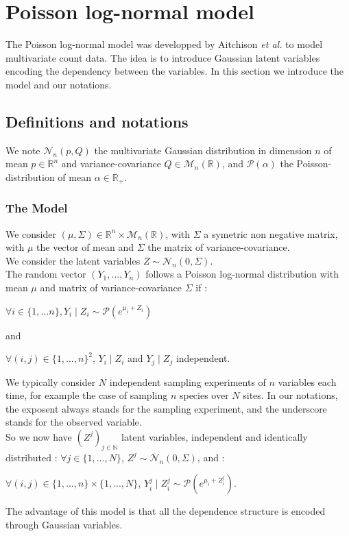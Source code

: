 \documentclass[11pt, a4paper]{article}
\begin{document}
\section{Poisson log-normal model}
The Poisson log-normal model was developped by Aitchison \textit{et al.}\cite{aitchison1989multivariate} to model multivariate count data.  The idea is to introduce Gaussian latent variables encoding the dependency between the variables. In this section we introduce the model and our notations.
\subsection{Definitions and notations}
We note $\mathcal{N}_n (p,Q)$ the multivariate Gaussian distribution in dimension $n$ of mean $p \in \mathbb{R}^n$ and variance-covariance $Q \in \mathcal{M}_n(\mathbb{R})$, and $\mathcal{P}(\alpha)$ the Poisson-distribution of mean $\alpha \in \mathbb{R}_+$.
\subsubsection{The Model} 
We consider $(\mu,\Sigma) \in \mathbb{R}^n \times \mathcal{M}_n(\mathbb{R})$, with $\Sigma$ a symetric non negative matrix, with $\mu$ the vector of mean and $\Sigma$ the matrix of variance-covariance.\\
We consider the latent variables $Z \sim \mathcal{N}_n(0,\Sigma)$.\\
The random vector $(Y_1,...,Y_n)$ follows a Poisson log-normal distribution with mean $\mu$ and matrix of variance-covariance $\Sigma$ if :
\begin{center}
$\forall i \in \{1,...n\}, Y_i \mid Z_i \sim \mathcal{P}(e^{\mu_i+Z_i})$
\end{center}
and 
\begin{center}
$\forall (i,j) \in \{1,...,n\}^2$, $ Y_i\mid Z_i$ and $Y_j\mid Z_j$ independent.
\end{center}

We typically consider $N$ independent sampling experiments of $n$ variables each time, for example the case of sampling $n$ species over $N$ sites. In our notations, the exposent always stands for the sampling experiment, and the underscore stands for the observed variable.\\
So we now have $(Z^j)_{j \in \mathbb{N}}$ latent variables, independent and identically distributed : $\forall j \in \{1,...,N\}$, $Z^j \sim \mathcal{N}_n(0,\Sigma)$, and :
\begin{center}
$\forall (i,j) \in \{1,...,n\} \times \{1,...,N\}$, $Y^j_i \mid Z^j_i \sim \mathcal{P}(e^{\mu_i+Z^j_i})$.
\end{center}
The advantage of this model is that all the dependence structure is encoded through Gaussian variables.
\end{document}
